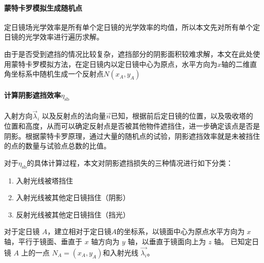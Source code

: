\documentclass[../main.tex]{subfiles}
\begin{document}
\paragraph{蒙特卡罗模拟生成随机点}
定日镜场光学效率是所有单个定日镜的光学效率的均值，所以本文先对所有单个定日镜的光学效率进行遍历求解。

由于是否受到遮挡的情况比较复杂，遮挡部分的阴影面积较难求解，本文在此处使用蒙特卡罗模拟方法，在定日镜内以定日镜中心为原点，水平方向为\(x\)轴的二维直角坐标系中随机生成一个反射点\(N(x_A,y_A)\)

\paragraph{计算阴影遮挡效率\(\eta_{\mathrm{s b}}\)} 入射方向\(\vec \lambda _{i}\) 以及反射点的法向量\(\vec n\)已知，根据前后定日镜的位置，以及吸收塔的位置和高度，从而可以确定反射点是否被其他物件遮挡住，进一步确定该点是否是阴影。根据蒙特卡罗原理，通过大量的随机点的试验，阴影遮挡效率就是未被挡住的点的数量与试验点总数的比值。

对于\(\eta _{\mathrm{s b}}\)的具体计算过程，本文对阴影遮挡损失的三种情况进行如下分类：
\begin{enumerate}
\item 入射光线被塔挡住
\item 入射光线被其他定日镜挡住（阴影）
\item 反射光线被其他定日镜挡住（挡光）
\end{enumerate}
对于定日镜 \(A\)，建立相对于定日镜\(A\)的坐标系，以镜面中心为原点水平方向为 \(x\) 轴，平行于镜面、垂直于 \(x\) 轴方向为 \(y\) 轴，以垂直于镜面向上为 \(z\) 轴。
已知定日镜 \(A\) 上的一点 \(N_{A} = (x_{A}, y_{A})\)和入射光线 \(\vec {\lambda _{i}}\)。
\end{document}
